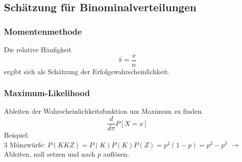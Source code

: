 \documentclass{article}
\begin{document}
\begin{multicols*}{3}
    \subsection{Schätzung für Binominalverteilungen}
    \subsubsection{Momentenmethode}
    Die relative Häufigkeit
    $$\hat{\pi } = \frac{x}{n}$$
    ergibt sich als Schätzung der Erfolgswahrscheinlichkeit.

    \subsubsection{Maximum-Likelihood}
    Ableiten der Wahrscheinlichkeitsfunktion um Maximum zu finden.
    $$\frac{d}{d\pi }{P[X=x]}$$
    Beispiel:\\
    3 Münzwürfe:
    $P(KKZ) = P(K)P(K)P(Z) = p^2(1-p)=p^2-p^3$ $\rightarrow$ Ableiten, null setzen und nach $p$ auflösen.


\end{multicols*}
\end{document}
